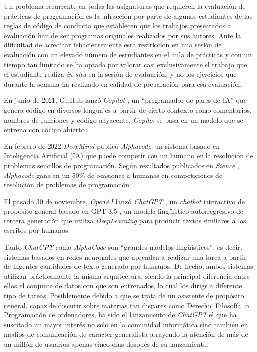 \documentclass[twocolumn,twoside,a4paper, 10pt]{article}
\newcommand{\ChatGPT}{\textit{ChatGPT}{}}           %
\begin{document}
Un problema recurrente en todas las asignaturas que requieren la evaluación de prácticas de programación es la
infracción por parte de algunos estudiantes de las reglas de código de conducta que establecen que los
trabajos presentados a evaluación han de ser programas originales realizados por sus autores.
Ante la dificultad de acreditar fehacientemente esta restricción en una sesión de evaluación con un elevado
número de estudiantes en el aula de prácticas y con un tiempo tan limitado se ha optado por valorar
casi exclusivamente el trabajo que el estudiante realiza \textit{in situ} en la sesión de evaluación, y no los
ejercicios que durante la semana ha realizado en calidad de preparación para esa evaluación.

En junio de 2021, GitHub lanzó \textit{Copilot} 
\cite{Nguyen:2022:AnEE},
un ``programador de pares de IA'' que genera 
código en diversos lenguajes a partir de cierto contexto como comentarios, nombres de funciones y código adyacente. 
\textit{Copilot} se basa en un modelo que se entrena con código abierto \cite{Chen:2021:ELL}.

En febrero de 2022 \textit{DeepMind} publicó \textit{Alphacode}, un sistema basado en Inteligencia Artificial
(IA) que puede competir con un humano en la resolución de problemas sencillos de programación.
Según resultados publicados en \textit{Sience} \cite{Li:2022:CCG}, \textit{Alphacode} gana en un 50\%
de ocasiones a humanos en competiciones de resolución de problemas de programación.

El pasado 30 de noviembre, \textit{OpenAI} lanzó \ChatGPT{}
\cite{Zhang:2020:chatgpt}, 
un \textit{chatbot} interactivo de propósito general basado en GPT-3.5
\cite{Floridi:2020:GPT-3},
un modelo lingüístico autorregresivo de tercera generación que utiliza \textit{DeepLearning} para producir textos 
similares a los escritos por humanos.

Tanto \ChatGPT{} como \textit{AlphaCode} son ``grandes modelos lingüísticos'', es decir, sistemas basados en 
redes neuronales que aprenden a realizar una tarea a partir de ingentes cantidades de texto generado por humanos. 
De hecho, ambos sistemas utilizan prácticamente la misma arquitectura, siendo la principal diferencia entre
ellos el conjunto de datos con que son entrenados, lo cual los dirige a diferente tipo de tareas.
Posiblemente debido a que se trata de un asistente de propósito general, capaz de discutir sobre materias tan dispares 
como Derecho, Filosofía, o Programación de ordenadores, ha sido el lanzamiento de \ChatGPT{} el que ha suscitado un mayor
interés no solo en la comunidad informática sino también en medios de comunicación de caracter generalista
\cite{Perez:2022:FBM} 
atrayendo la atención de más de un millón de usuarios apenas cinco días después de su lanzamiento.
\end{document}

